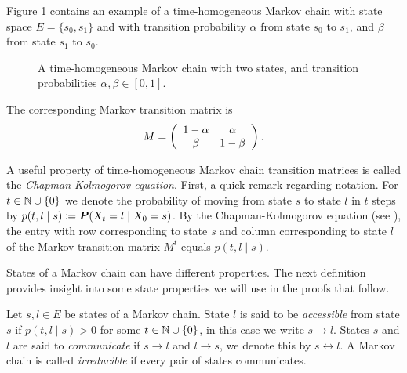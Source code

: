 \begin{ex}\label{ex:markov_chain}
Figure \ref{fig:markov_example} contains an example of a time-homogeneous Markov chain with state space $E=\{s_0,s_1\}$ and with transition probability $\alpha$ from state $s_0$ to $s_1$, and $\beta$ from state $s_1$ to $s_0$.
\begin{figure}[H]
    \centering
    \caption{A time-homogeneous Markov chain with two states, and transition probabilities $\alpha, \beta \in [0,1]$.}
    \label{fig:markov_example}
\end{figure}
The corresponding Markov transition matrix is 
    \begin{align*}
    M =
        \left(
        \begin{array}{c c}
        1-\alpha & \alpha \\
        \beta & 1-\beta
        \end{array}
        \right).
    \end{align*}

\end{ex}

A useful property of time-homogeneous Markov chain transition matrices is called the \textit{Chapman-Kolmogorov equation}. First, a quick remark regarding notation. For $t\in\mathbb{N}\cup\{0\}$ we denote the probability of moving from state $s$ to state $l$ in $t$ steps by $p(t,l\mid s)\coloneqq \boldsymbol{P}(X_{t} = l \mid X_0 = s)$. By the Chapman-Kolmogorov equation (see \cite[Theorem~(7), \S6.1]{thr:kolmog}), the entry with row corresponding to state $s$ and column corresponding to state $l$ of the Markov transition matrix $M^t$ equals $p(t,l\mid s)$.

States of a Markov chain can have different properties. The next definition provides insight into some state properties we will use in the proofs that follow.

\begin{df}
    Let $s,l\in E$ be states of a Markov chain. State $l$ is said to be \textit{accessible} from state $s$ if $p(t,l\mid s)>0$ for some $t\in\mathbb{N}\cup\{0\}$, in this case we write $s\rightarrow l$. States $s$ and $l$ are said to \textit{communicate} if $s\rightarrow l$ and $l\rightarrow s$, we denote this by $s\leftrightarrow l$. A Markov chain is called \textit{irreducible} if every pair of states communicates.
\end{df}


